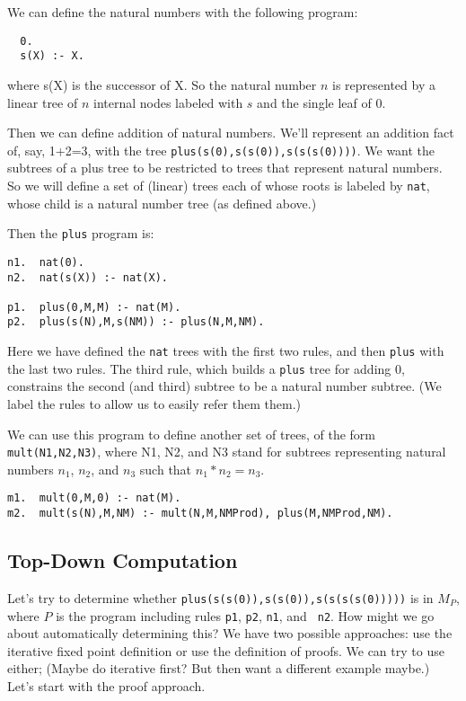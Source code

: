 \begin{example}
We can define the natural numbers with the following program:
\begin{verbatim}
  0.
  s(X) :- X.
\end{verbatim}
where s(X) is the successor of X.  So the natural number $n$ is
represented by a linear tree of $n$ internal nodes labeled with $s$
and the single leaf of $0$.

Then we can define addition of natural numbers.  We'll represent an
addition fact of, say, 1+2=3, with the tree
\verb|plus(s(0),s(s(0)),s(s(s(0))))|.
We want the subtrees of a plus tree to be restricted to trees that
represent natural numbers.  So we will define a set of (linear) trees
each of whose roots is labeled by {\tt nat}, whose child is a natural
number tree (as defined above.)

Then the {\tt plus} program is:
\begin{verbatim}
n1.  nat(0).
n2.  nat(s(X)) :- nat(X).

p1.  plus(0,M,M) :- nat(M).
p2.  plus(s(N),M,s(NM)) :- plus(N,M,NM).
\end{verbatim}
Here we have defined the {\tt nat} trees with the first two rules, and
then {\tt plus} with the last two rules.  The third rule, which builds
a {\tt plus} tree for adding $0$, constrains the second (and third)
subtree to be a natural number subtree.  (We label the rules to allow
us to easily refer them them.)
\end{example}

\begin{example}
We can use this program to define another set of trees, of the form
\verb|mult(N1,N2,N3)|, where N1, N2, and N3 stand for subtrees
representing natural numbers $n_1$, $n_2$, and $n_3$ such that
$n_1*n_2=n_3$.

\begin{verbatim}
m1.  mult(0,M,0) :- nat(M).
m2.  mult(s(N),M,NM) :- mult(N,M,NMProd), plus(M,NMProd,NM).
\end{verbatim}
\end{example}

\subsection{Top-Down Computation}
Let's try to determine whether
\verb|plus(s(s(0)),s(s(0)),s(s(s(s(0)))))| is in $M_P$, where $P$ is
the program including rules {\tt p1}, {\tt p2}, {\tt n1}, and {\tt
  n2}.  How might we go about automatically determining this?  We have
two possible approaches: use the iterative fixed point definition or
use the definition of proofs.  We can try to use either; (Maybe do
iterative first?  But then want a different example maybe.)  Let's
start with the proof approach.

